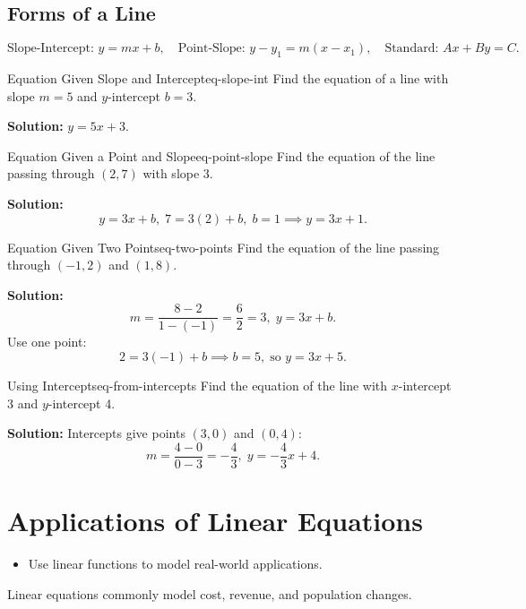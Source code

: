 \subsection*{Forms of a Line}
\[
\text{Slope-Intercept: }y=mx+b,\quad \text{Point-Slope: }y-y_1=m(x-x_1),\quad \text{Standard: }Ax+By=C.
\]

\begin{example}{Equation Given Slope and Intercept}{eq-slope-int}
Find the equation of a line with slope \(m=5\) and $y$-intercept \(b=3\).

\textbf{Solution:} \(y=5x+3.\)
\end{example}

\begin{example}{Equation Given a Point and Slope}{eq-point-slope}
Find the equation of the line passing through \((2,7)\) with slope \(3\).

\textbf{Solution:}
\[
y=3x+b,\; 7=3(2)+b,\; b=1 \implies y=3x+1.
\]
\end{example}

\begin{example}{Equation Given Two Points}{eq-two-points}
Find the equation of the line passing through \((-1,2)\) and \((1,8)\).

\textbf{Solution:}
\[
m=\frac{8-2}{1-(-1)}=\frac{6}{2}=3,\; y=3x+b.
\]
Use one point:
\[
2=3(-1)+b \implies b=5,\; \text{so } y=3x+5.
\]
\end{example}

\begin{example}{Using Intercepts}{eq-from-intercepts}
Find the equation of the line with $x$-intercept 3 and $y$-intercept 4.

\textbf{Solution:} Intercepts give points $(3,0)$ and $(0,4)$:
\[
m=\frac{4-0}{0-3}=-\frac{4}{3},\;y=-\frac{4}{3}x+4.
\]
\end{example}

\section{Applications of Linear Equations}
\begin{outcome}
\begin{itemize}
\item Use linear functions to model real-world applications.
\end{itemize}
\end{outcome}

Linear equations commonly model cost, revenue, and population changes.

